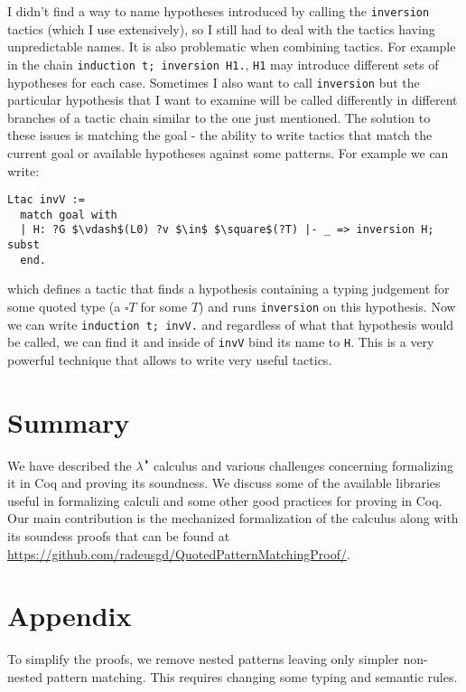 \documentclass[runningheads]{article}
\begin{document}
I didn't find a way to name hypotheses introduced by calling the \verb|inversion| tactics (which I use extensively), so I still had to deal with the tactics having unpredictable names. It is also problematic when combining tactics. For example in the chain \verb|induction t; inversion H1.|, \verb|H1| may introduce different sets of hypotheses for each case. Sometimes I also want to call \verb|inversion| but the particular hypothesis that I want to examine will be called differently in different branches of a tactic chain similar to the one just mentioned. The solution to these issues is matching the goal - the ability to write tactics that match the current goal or available hypotheses against some patterns. For example we can write:
\begin{lstlisting}[mathescape=true]
Ltac invV :=
  match goal with
  | H: ?G $\vdash$(L0) ?v $\in$ $\square$(?T) |- _ => inversion H; subst
  end.
\end{lstlisting}
which defines a tactic that finds a hypothesis containing a typing judgement for some quoted type (a $\square T$ for some $T$) and runs \verb|inversion| on this hypothesis. Now we can write \verb|induction t; invV.| and regardless of what that hypothesis would be called, we can find it and inside of \verb|invV| bind its name to \verb|H|. This is a very powerful technique that allows to write very useful tactics.


\section{Summary}
\label{sec:summary}

We have described the $\lambda^{\RIGHTcircle}$ calculus and various challenges concerning formalizing it in Coq and proving its soundness. We discuss some of the available libraries useful in formalizing calculi and some other good practices for proving in Coq. Our main contribution is the mechanized formalization of the calculus along with its soundess proofs that can be found at \href{https://github.com/radeusgd/QuotedPatternMatchingProof/}{https://github.com/radeusgd/QuotedPatternMatchingProof/}.





\section*{Appendix}



To simplify the proofs, we remove nested patterns leaving only simpler non-nested pattern matching. This requires changing some typing and semantic rules.
\end{document}
